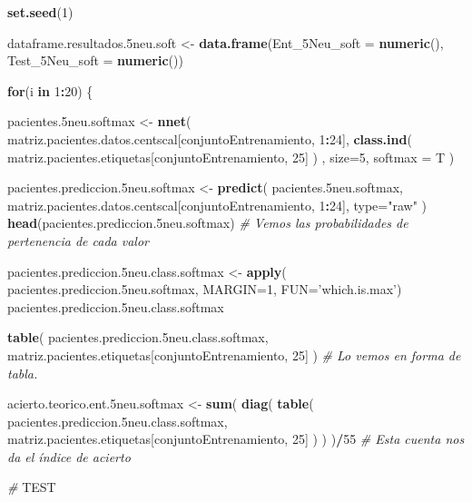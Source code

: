 \documentclass[]{article}
\newenvironment{Shaded}{\begin{snugshade}}{\end{snugshade}}
\newcommand{\KeywordTok}[1]{\textcolor[rgb]{0.13,0.29,0.53}{\textbf{#1}}}
\newcommand{\DataTypeTok}[1]{\textcolor[rgb]{0.13,0.29,0.53}{#1}}
\newcommand{\DecValTok}[1]{\textcolor[rgb]{0.00,0.00,0.81}{#1}}
\newcommand{\StringTok}[1]{\textcolor[rgb]{0.31,0.60,0.02}{#1}}
\newcommand{\CommentTok}[1]{\textcolor[rgb]{0.56,0.35,0.01}{\textit{#1}}}
\newcommand{\ControlFlowTok}[1]{\textcolor[rgb]{0.13,0.29,0.53}{\textbf{#1}}}
\newcommand{\OperatorTok}[1]{\textcolor[rgb]{0.81,0.36,0.00}{\textbf{#1}}}
\newcommand{\AlertTok}[1]{\textcolor[rgb]{0.94,0.16,0.16}{#1}}
\newcommand{\NormalTok}[1]{#1}
\begin{document}
\begin{Shaded}
\begin{Highlighting}[]
\KeywordTok{set.seed}\NormalTok{(}\DecValTok{1}\NormalTok{)}

\NormalTok{dataframe.resultados.5neu.soft <-}\StringTok{ }\KeywordTok{data.frame}\NormalTok{(}\DataTypeTok{Ent_5Neu_soft =} \KeywordTok{numeric}\NormalTok{(),}
                                             \DataTypeTok{Test_5Neu_soft =} \KeywordTok{numeric}\NormalTok{())}

\ControlFlowTok{for}\NormalTok{(i }\ControlFlowTok{in} \DecValTok{1}\OperatorTok{:}\DecValTok{20}\NormalTok{)}
\NormalTok{\{}

\NormalTok{  pacientes.5neu.softmax <-}\StringTok{ }\KeywordTok{nnet}\NormalTok{( matriz.pacientes.datos.centscal[conjuntoEntrenamiento, }\DecValTok{1}\OperatorTok{:}\DecValTok{24}\NormalTok{], }\KeywordTok{class.ind}\NormalTok{( matriz.pacientes.etiquetas[conjuntoEntrenamiento, }\DecValTok{25}\NormalTok{] ) , }\DataTypeTok{size=}\DecValTok{5}\NormalTok{, }\DataTypeTok{softmax =}\NormalTok{ T )}
  
\NormalTok{  pacientes.prediccion.5neu.softmax <-}\StringTok{ }\KeywordTok{predict}\NormalTok{( pacientes.5neu.softmax, matriz.pacientes.datos.centscal[conjuntoEntrenamiento, }\DecValTok{1}\OperatorTok{:}\DecValTok{24}\NormalTok{], }\DataTypeTok{type=}\StringTok{"raw"}\NormalTok{ )}
  \KeywordTok{head}\NormalTok{(pacientes.prediccion.5neu.softmax) }\CommentTok{# Vemos las probabilidades de pertenencia de cada valor}
  
\NormalTok{  pacientes.prediccion.5neu.class.softmax <-}\StringTok{ }\KeywordTok{apply}\NormalTok{( pacientes.prediccion.5neu.softmax, }\DataTypeTok{MARGIN=}\DecValTok{1}\NormalTok{, }\DataTypeTok{FUN=}\StringTok{'which.is.max'}\NormalTok{)}
\NormalTok{  pacientes.prediccion.5neu.class.softmax}
  
  \KeywordTok{table}\NormalTok{( pacientes.prediccion.5neu.class.softmax, matriz.pacientes.etiquetas[conjuntoEntrenamiento, }\DecValTok{25}\NormalTok{] )  }\CommentTok{# Lo vemos en forma de tabla.}
  
\NormalTok{  acierto.teorico.ent.5neu.softmax <-}\StringTok{ }\KeywordTok{sum}\NormalTok{( }\KeywordTok{diag}\NormalTok{( }\KeywordTok{table}\NormalTok{( pacientes.prediccion.5neu.class.softmax, matriz.pacientes.etiquetas[conjuntoEntrenamiento, }\DecValTok{25}\NormalTok{] ) ) )}\OperatorTok{/}\DecValTok{55} \CommentTok{# Esta cuenta nos da el índice de acierto}
  
  \CommentTok{# }\AlertTok{TEST}
  

\end{Highlighting}
\end{Shaded}
\end{document}
